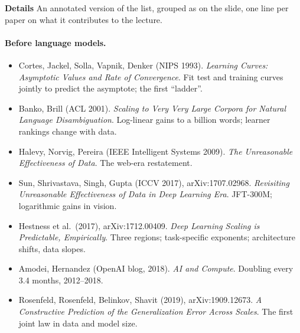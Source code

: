 \documentclass[11pt,letterpaper]{article}
\newcommand{\para}[1]{\medskip\noindent\textbf{#1}\quad}
\newcommand{\paper}[1]{\textit{#1}}
\begin{document}
\para{Details} An annotated version of the list, grouped as on the slide, one line per paper on what it contributes to the lecture.

\paragraph{Before language models.}
\begin{itemize}
\item Cortes, Jackel, Solla, Vapnik, Denker (NIPS 1993). \paper{Learning Curves: Asymptotic Values and Rate of Convergence}. Fit test and training curves jointly to predict the asymptote; the first ``ladder''.
\item Banko, Brill (ACL 2001). \paper{Scaling to Very Very Large Corpora for Natural Language Disambiguation}. Log-linear gains to a billion words; learner rankings change with data.
\item Halevy, Norvig, Pereira (IEEE Intelligent Systems 2009). \paper{The Unreasonable Effectiveness of Data}. The web-era restatement.
\item Sun, Shrivastava, Singh, Gupta (ICCV 2017), arXiv:1707.02968. \paper{Revisiting Unreasonable Effectiveness of Data in Deep Learning Era}. JFT-300M; logarithmic gains in vision.
\item Hestness et al.\ (2017), arXiv:1712.00409. \paper{Deep Learning Scaling is Predictable, Empirically}. Three regions; task-specific exponents; architecture shifts, data slopes.
\item Amodei, Hernandez (OpenAI blog, 2018). \paper{AI and Compute}. Doubling every 3.4 months, 2012--2018.
\item Rosenfeld, Rosenfeld, Belinkov, Shavit (2019), arXiv:1909.12673. \paper{A Constructive Prediction of the Generalization Error Across Scales}. The first joint law in data and model size.
\end{itemize}
\end{document}
